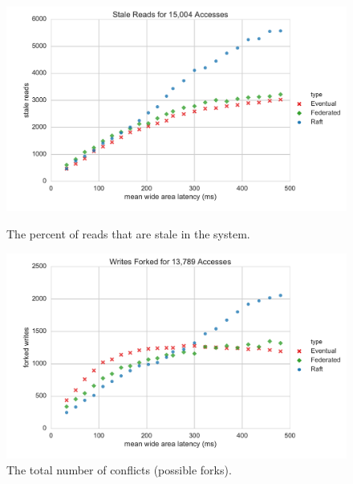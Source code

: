 \documentclass[10pt,conference,letterpaper]{IEEEtran}
\begin{document}
\begin{figure}[t]
    \centering
      \includegraphics[width=\linewidth]{figures/latency/stale_reads}
      \caption{The percent of reads that are stale in the system.}\label{fig:latency_stale_reads}
    \endminipage
      \includegraphics[width=\linewidth]{figures/latency/forked_writes}
      \caption{The total number of conflicts (possible forks).}\label{fig:latency_forked_writes}
    \endminipage\hfill
\end{figure}
\end{document}
